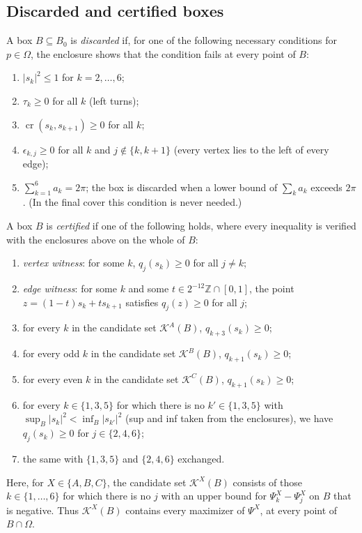 \documentclass[11pt]{amsart}
\theoremstyle{definition}
\theoremstyle{remark}
\newcommand{\Z}{\mathbb{Z}}
\newcommand{\cross}{\operatorname{cr}}
\begin{document}
\subsection{Discarded and certified boxes}
A box $B\subseteq B_0$ is \emph{discarded} if, for one of the following necessary conditions for $p\in\Omega$, the enclosure shows that the condition fails at every point of $B$:
\begin{enumerate}[label=(N\arabic*),leftmargin=3em]
\item $\lvert s_k\rvert^2\le1$ for $k=2,\dots,6$;
\item $\tau_k\ge0$ for all $k$ (left turns);
\item $\cross(s_k,s_{k+1})\ge0$ for all $k$;
\item $\epsilon_{k,j}\ge0$ for all $k$ and $j\notin\{k,k+1\}$ (every vertex lies to the left of every edge);
\item $\sum_{k=1}^6a_k=2\pi$; the box is discarded when a lower bound of $\sum_ka_k$ exceeds $2\pi$. (In the final cover this condition is never needed.)
\end{enumerate}
A box $B$ is \emph{certified} if one of the following holds, where every inequality is verified with the enclosures above on the whole of $B$:
\begin{enumerate}[label=(\arabic*),leftmargin=2.5em]
\item[(W$_v$)] \emph{vertex witness}: for some $k$, $q_j(s_k)\ge0$ for all $j\neq k$;
\item[(W$_e$)] \emph{edge witness}: for some $k$ and some $t\in2^{-12}\Z\cap[0,1]$, the point $z=(1-t)s_k+ts_{k+1}$ satisfies $q_j(z)\ge0$ for all $j$;
\item[(A)] for every $k$ in the candidate set $\mathcal K^A(B)$, $q_{k+3}(s_k)\ge0$;
\item[(B)] for every odd $k$ in the candidate set $\mathcal K^B(B)$, $q_{k+1}(s_k)\ge0$;
\item[(C)] for every even $k$ in the candidate set $\mathcal K^C(B)$, $q_{k+1}(s_k)\ge0$;
\item[(L$_1$)] for every $k\in\{1,3,5\}$ for which there is no $k'\in\{1,3,5\}$ with $\sup_B\lvert s_k\rvert^2<\inf_B\lvert s_{k'}\rvert^2$ (sup and inf taken from the enclosures), we have $q_j(s_k)\ge0$ for $j\in\{2,4,6\}$;
\item[(L$_2$)] the same with $\{1,3,5\}$ and $\{2,4,6\}$ exchanged.
\end{enumerate}
Here, for $X\in\{A,B,C\}$, the candidate set $\mathcal K^X(B)$ consists of those $k\in\{1,\dots,6\}$ for which there is no $j$ with an upper bound for $\Psi^X_k-\Psi^X_j$ on $B$ that is negative. Thus $\mathcal K^X(B)$ contains every maximizer of $\Psi^X$, at every point of $B\cap\Omega$.
\end{document}
